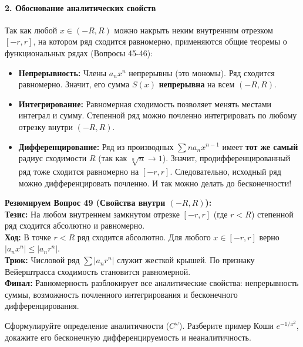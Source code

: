 \paragraph{2. Обоснование аналитических свойств}
Так как любой $x \in (-R, R)$ можно накрыть неким внутренним отрезком $[-r, r]$, на котором ряд сходится равномерно, применяются общие теоремы о функциональных рядах (Вопросы 45-46):
\begin{itemize}
    \item \textbf{Непрерывность:} Члены $a_n x^n$ непрерывны (это мономы). Ряд сходится равномерно. Значит, его сумма $S(x)$ \textbf{непрерывна} на всем $(-R, R)$.
    \item \textbf{Интегрирование:} Равномерная сходимость позволяет менять местами интеграл и сумму. Степенной ряд можно почленно интегрировать по любому отрезку внутри $(-R, R)$.
    \item \textbf{Дифференцирование:} Ряд из производных $\sum n a_n x^{n-1}$ имеет \textbf{тот же самый} радиус сходимости $R$ (так как $\sqrt[n]{n} \to 1$). Значит, продифференцированный ряд тоже сходится равномерно на $[-r, r]$. Следовательно, исходный ряд можно дифференцировать почленно. И так можно делать до бесконечности!
\end{itemize}

\begin{tcolorbox}[colback=gray!5, colframe=black, boxrule=0.5pt, arc=0pt]
\textbf{Резюмируем Вопрос 49 (Свойства внутри $(-R, R)$):} \\
\textbf{Тезис:} На любом внутреннем замкнутом отрезке $[-r, r]$ (где $r < R$) степенной ряд сходится абсолютно и равномерно. \\
\textbf{Ход:} В точке $r < R$ ряд сходится абсолютно. Для любого $x \in [-r, r]$ верно $|a_n x^n| \le |a_n r^n|$. \\
\textbf{Трюк:} Числовой ряд $\sum |a_n r^n|$ служит жесткой крышей. По признаку Вейерштрасса сходимость становится равномерной. \\
\textbf{Финал:} Равномерность разблокирует все аналитические свойства: непрерывность суммы, возможность почленного интегрирования и бесконечного дифференцирования.
\end{tcolorbox}



{Сформулируйте определение аналитичности ($C^\omega$). Разберите пример Коши $e^{-1/x^2}$, докажите его бесконечную дифференцируемость и неаналитичность.}

